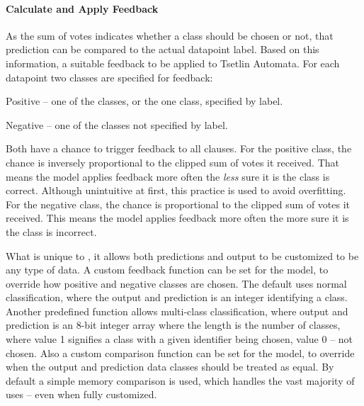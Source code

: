 \paragraph{Calculate and Apply Feedback}
As the sum of votes indicates whether a class should be chosen or not, that prediction can be compared to the actual datapoint label. Based on this information, a suitable feedback to be applied to Tsetlin Automata. 
For each datapoint two classes are specified for feedback:
\begin{compactitem}
    \item Positive -- one of the classes, or the one class, specified by label.
    \item Negative -- one of the classes not specified by label.
\end{compactitem}
Both have a chance to trigger feedback to all clauses. 
For the positive class, the chance is inversely proportional to the clipped sum of votes it received. That means the model applies feedback more often the \textit{less} sure it is the class is correct. Although unintuitive at first, this practice is used to avoid overfitting. 
For the negative class, the chance is proportional to the clipped sum of votes it received. This means the model applies feedback more often the more sure it is the class is incorrect.

What is unique to \LibraryName, it allows both predictions and output to be customized to be any type of data. 
A custom feedback function can be set for the model, to override how positive and negative classes are chosen. The default uses normal classification, where the output and prediction is an integer identifying a class. 
Another predefined function allows multi-class classification, where output and prediction is an 8-bit integer array where the length is the number of classes, where value 1 signifies a class with a given identifier being chosen, value 0 -- not chosen. 
Also a custom comparison function can be set for the model, to override when the output and prediction data classes should be treated as equal. By default a simple memory comparison is used, which handles the vast majority of uses -- even when fully customized.

